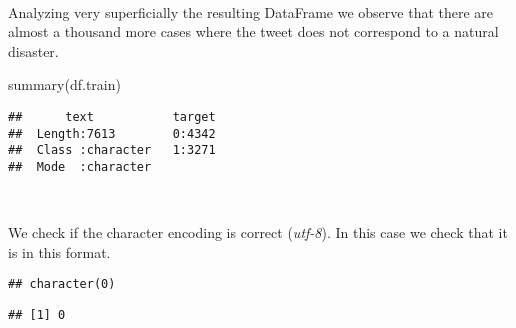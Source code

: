 \documentclass[
]{article}
\newenvironment{Shaded}{\begin{snugshade}}{\end{snugshade}}
\newcommand{\CommentTok}[1]{\textcolor[rgb]{0.56,0.35,0.01}{\textit{#1}}}
\newcommand{\FunctionTok}[1]{\textcolor[rgb]{0.00,0.00,0.00}{#1}}
\newcommand{\NormalTok}[1]{#1}
\newcommand{\OtherTok}[1]{\textcolor[rgb]{0.56,0.35,0.01}{#1}}
\newcommand{\SpecialCharTok}[1]{\textcolor[rgb]{0.00,0.00,0.00}{#1}}
\begin{document}
~

Analyzing very superficially the resulting DataFrame we observe that
there are almost a thousand more cases where the tweet does not
correspond to a natural disaster.

\begin{Shaded}
\begin{Highlighting}[]
\FunctionTok{summary}\NormalTok{(df.train)}
\end{Highlighting}
\end{Shaded}

\begin{verbatim}
##      text           target  
##  Length:7613        0:4342  
##  Class :character   1:3271  
##  Mode  :character
\end{verbatim}

~

We check if the character encoding is correct (\emph{utf-8}). In this
case we check that it is in this format.

\begin{Shaded}
\end{Shaded}

\begin{verbatim}
## character(0)
\end{verbatim}

\begin{Shaded}
\end{Shaded}

\begin{verbatim}
## [1] 0
\end{verbatim}

\begin{Shaded}
\end{Shaded}
\end{document}

